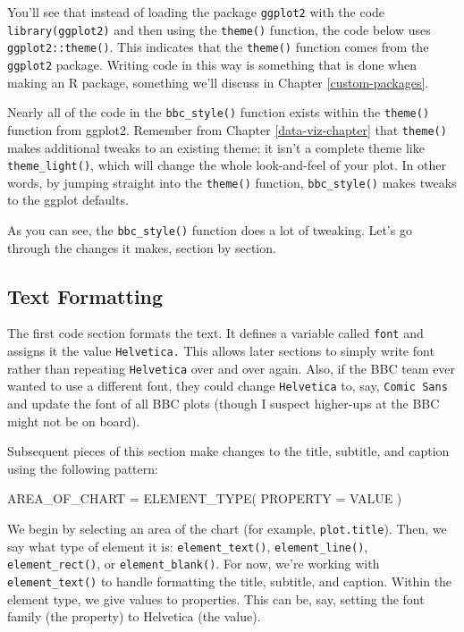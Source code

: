 \documentclass[
]{book}
\newenvironment{Shaded}{\begin{snugshade}}{\end{snugshade}}
\newcommand{\AttributeTok}[1]{\textcolor[rgb]{0.77,0.63,0.00}{#1}}
\newcommand{\FunctionTok}[1]{\textcolor[rgb]{0.00,0.00,0.00}{#1}}
\newcommand{\NormalTok}[1]{#1}
\newcommand{\OtherTok}[1]{\textcolor[rgb]{0.56,0.35,0.01}{#1}}
\begin{document}
You'll see that instead of loading the package \texttt{ggplot2} with the code \texttt{library(ggplot2)} and then using the \texttt{theme()} function, the code below uses \texttt{ggplot2::theme()}. This indicates that the \texttt{theme()} function comes from the \texttt{ggplot2} package. Writing code in this way is something that is done when making an R package, something we'll discuss in Chapter \ref{custom-packages}.

Nearly all of the code in the \texttt{bbc\_style()} function exists within the \texttt{theme()} function from ggplot2. Remember from Chapter \ref{data-viz-chapter} that \texttt{theme()} makes additional tweaks to an existing theme; it isn't a complete theme like \texttt{theme\_light()}, which will change the whole look-and-feel of your plot. In other words, by jumping straight into the \texttt{theme()} function, \texttt{bbc\_style()} makes tweaks to the ggplot defaults.

As you can see, the \texttt{bbc\_style()} function does a lot of tweaking. Let's go through the changes it makes, section by section.

\hypertarget{text-formatting}{%
\subsection*{Text Formatting}\label{text-formatting}}

The first code section formats the text. It defines a variable called \texttt{font} and assigns it the value \texttt{Helvetica.} This allows later sections to simply write font rather than repeating \texttt{Helvetica} over and over again. Also, if the BBC team ever wanted to use a different font, they could change \texttt{Helvetica} to, say, \texttt{Comic\ Sans} and update the font of all BBC plots (though I suspect higher-ups at the BBC might not be on board).

Subsequent pieces of this section make changes to the title, subtitle, and caption using the following pattern:

\begin{Shaded}
\begin{Highlighting}[]
\NormalTok{AREA\_OF\_CHART }\OtherTok{=} \FunctionTok{ELEMENT\_TYPE}\NormalTok{(}
  \AttributeTok{PROPERTY =}\NormalTok{ VALUE}
\NormalTok{)}
\end{Highlighting}
\end{Shaded}

We begin by selecting an area of the chart (for example, \texttt{plot.title}). Then, we say what type of element it is: \texttt{element\_text()}, \texttt{element\_line()}, \texttt{element\_rect()}, or \texttt{element\_blank()}. For now, we're working with \texttt{element\_text()} to handle formatting the title, subtitle, and caption. Within the element type, we give values to properties. This can be, say, setting the font family (the property) to Helvetica (the value).
\end{document}
